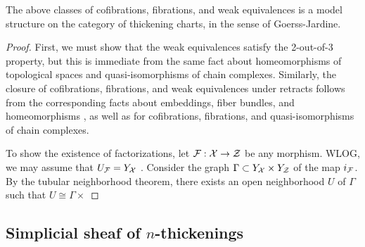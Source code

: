 \begin{prop}\label{model-structure}
The above classes of cofibrations, fibrations, and weak equivalences is a model structure on the category of thickening charts, in the sense of Goerss-Jardine.  
\end{prop}

\begin{proof}

First, we must show that the weak equivalences satisfy the 2-out-of-3 property, but this is immediate from the same fact about homeomorphisms of topological spaces and quasi-isomorphisms of chain complexes. Similarly, the closure of cofibrations, fibrations, and weak equivalences under retracts follows from the corresponding facts about embeddings, fiber bundles, and homeomorphisms , as well as for cofibrations, fibrations, and quasi-isomorphisms of chain complexes.

To show the existence of factorizations, let $\mathcal F: \mathcal X \to \mathcal Z$ be any morphism. WLOG, we may assume that $U_\mathcal F = Y_\mathcal X$ . Consider the graph $\Gamma \subset Y_\mathcal X \times Y_\mathcal Z$ of the map $i_\mathcal F$. By the tubular neighborhood theorem, there exists an open neighborhood $U$ of $\Gamma$ such that $U \cong \Gamma \times $

\end{proof}

\subsection{Simplicial sheaf of $n$-thickenings}

